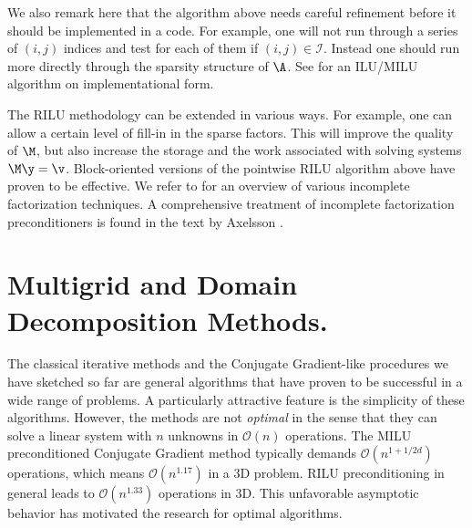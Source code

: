 
We also remark here that the algorithm above needs careful refinement
before it should be implemented in a code. For example,
one will not run through a series of $(i,j)$ indices and test for
each of them if $(i,j)\in\mathcal{I}$. Instead one should run more directly
through the sparsity structure of $\A$.
See \cite{Lan89} for an ILU/MILU algorithm on implementational form.

The RILU methodology can be extended in various ways. For example,
one can allow
a certain level of fill-in in the sparse factors. This will improve
the quality of $\M$, but also increase the storage and the work
associated with solving systems $\M\y =\v$. Block-oriented versions
of the pointwise RILU algorithm above have proven to be effective.
We refer to \cite{linalgtemplates93,BruBok} for an overview of various
incomplete factorization techniques.
A comprehensive treatment of incomplete factorization
preconditioners is found in the text
by Axelsson \cite{Axelsson}.

\section{Multigrid and Domain Decomposition Methods.}
\label{ch:linalg:MLDD}
The classical iterative methods and the Conjugate Gradient-like procedures
we have sketched so far are general algorithms that have proven to
be successful in a wide range of problems.
A particularly attractive feature is the simplicity of these algorithms.
However, the methods are not \emph{optimal} in the sense that
they can solve a linear system with $n$ unknowns in $\mathcal{O}(n)$ operations.
The MILU preconditioned Conjugate Gradient method typically demands
$\mathcal{O}(n^{1+1/2d})$ operations, which means $\mathcal{O}(n^{1.17})$
in a 3D problem. RILU preconditioning in general leads to
$\mathcal{O}(n^{1.33})$ operations in 3D.
This unfavorable asymptotic behavior has motivated the research for
optimal algorithms.

